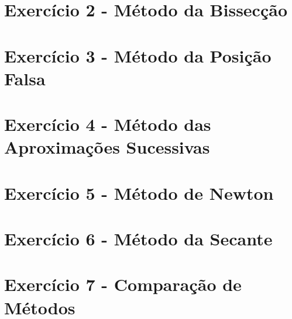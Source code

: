 \documentclass{article}
\begin{document}
\section{Exercício 2 - Método da Bissecção}

\section{Exercício 3 - Método da Posição Falsa}

\section{Exercício 4 - Método das Aproximações Sucessivas}

\section{Exercício 5 - Método de Newton}

\section{Exercício 6 - Método da Secante}

\section{Exercício 7 - Comparação de Métodos}
\end{document}
